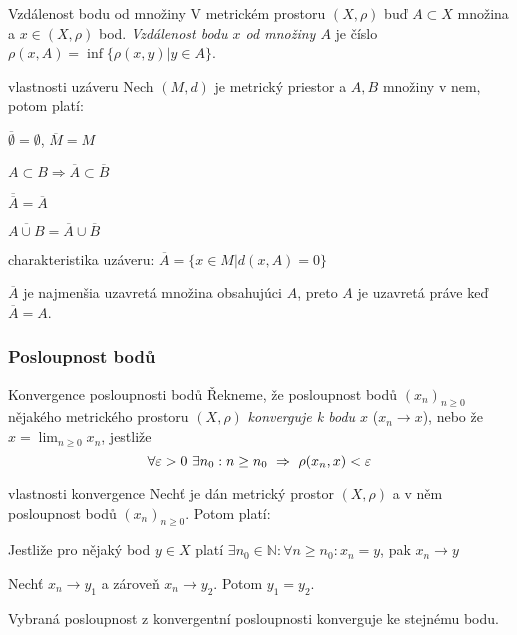 \begin{definiceN}{Vzdálenost bodu od množiny}
V metrickém prostoru $(X,\rho)$ buď $A\subset X$ množina a $x\in(X,\rho)$ bod. \emph{Vzdálenost bodu $x$ od množiny $A$} je číslo $\rho(x,A)=\inf\{\rho(x,y)|y\in A\}$.
\end{definiceN}

\begin{vetaSKN}{vlastnosti uzáveru}
Nech $(M,d)$ je metrický priestor a $A,B$ množiny v nem, potom platí:
\begin{penumerate}
\item $\overline{\emptyset} = \emptyset$, $\overline{M} = M$
\item $A \subset B \Rightarrow \overline{A} \subset \overline{B}$
\item $\overline{\overline{A}} = \overline{A}$
\item $\overline{A \cup B} = \overline{A} \cup \overline{B}$
\item charakteristika uzáveru: $\overline{A} = \{x \in M| d(x,A) = 0\}$
\item $\overline{A}$ je najmenšia uzavretá množina obsahujúci $A$, preto $A$ je uzavretá práve keď $\overline{A}=A$.
\end{penumerate}
\end{vetaSKN}

\subsubsection*{Posloupnost bodů}

\begin{definiceN}{Konvergence posloupnosti bodů}
Řekneme, že posloupnost bodů $(x_n)_{n\geq 0}$ nějakého metrického prostoru $(X,\rho)$ \emph{konverguje k bodu $x$} ($x_n\to x$), nebo že $x=\lim_{n\geq 0} x_n$,  jestliže
$$\forall\varepsilon>0\ \exists n_0:n\geq n_0\ \Rightarrow\ \rho(x_n,x)<\varepsilon$$
\end{definiceN}

\begin{poznamkaN}{vlastnosti konvergence}
Nechť je dán metrický prostor $(X,\rho)$ a v něm posloupnost bodů $(x_n)_{n\geq 0}$. Potom platí:
\begin{penumerate}
    \item Jestliže pro nějaký bod $y\in X$ platí $\exists n_0\in\mathbb{N}: \forall n\geq n_0: x_n = y$, pak $x_n\to y$
    \item Nechť $x_n\to y_1$ a zároveň $x_n\to y_2$. Potom $y_1=y_2$.
    \item Vybraná posloupnost z konvergentní posloupnosti konverguje ke stejnému bodu.
\end{penumerate}
\end{poznamkaN}

